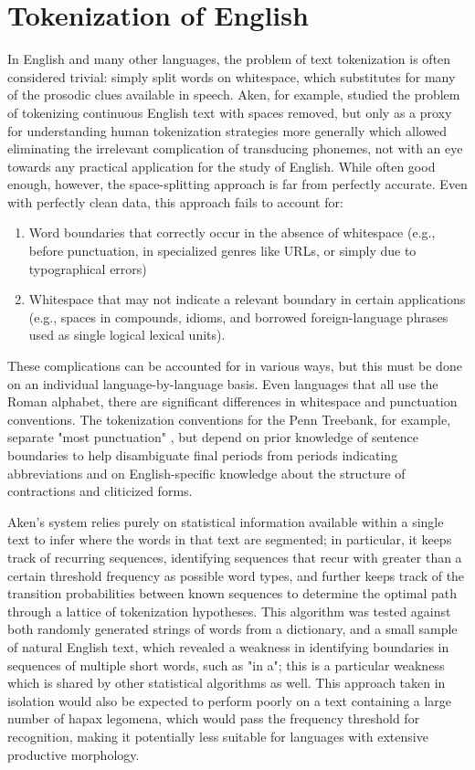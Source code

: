 \section{Tokenization of English}
In English and many other languages, the problem of text tokenization is often considered trivial: simply split words on whitespace, which substitutes for many of the prosodic clues available in speech. Aken\cite{aken11}, for example, studied the problem of tokenizing continuous English text with spaces removed, but only as a proxy for understanding human tokenization strategies more generally which allowed eliminating the irrelevant complication of transducing phonemes, not with an eye towards any practical application for the study of English. While often good enough, however, the space-splitting approach is far from perfectly accurate. Even with perfectly clean data, this approach fails to account for:
\begin{enumerate}
	\item Word boundaries that correctly occur in the absence of whitespace (e.g., before punctuation, in specialized genres like URLs, or simply due to typographical errors)
	\item Whitespace that may not indicate a relevant boundary in certain applications (e.g., spaces in compounds, idioms, and borrowed foreign-language phrases used as single logical lexical units).
\end{enumerate}
These complications can be accounted for in various ways, but this must be done on an individual language-by-language basis. Even languages that all use the Roman alphabet, there are significant differences in whitespace and punctuation conventions. The tokenization conventions for the Penn Treebank, for example, separate "most punctuation" \cite{treebank}, but depend on prior knowledge of sentence boundaries to help disambiguate final periods from periods indicating abbreviations and on English-specific knowledge about the structure of contractions and cliticized forms.

Aken's system relies purely on statistical information available within a single text to infer where the words in that text are segmented; in particular, it keeps track of recurring sequences, identifying sequences that recur with greater than a certain threshold frequency as possible word types, and further keeps track of the transition probabilities between known sequences to determine the optimal path through a lattice of tokenization hypotheses\cite{aken11}. This algorithm was tested against both randomly generated strings of words from a dictionary, and a small sample of natural English text, which revealed a weakness in identifying boundaries in sequences of multiple short words, such as "in a"; this is a particular weakness which is shared by other statistical algorithms as well. This approach taken in isolation would also be expected to perform poorly on a text containing a large number of hapax legomena, which would pass the frequency threshold for recognition, making it potentially less suitable for languages with extensive productive morphology.

